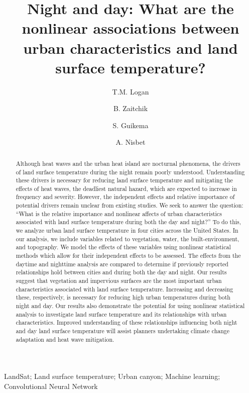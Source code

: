 \documentclass[final,3p,times,twocolumn,sort&compress]{elsarticle}
\begin{document}
\begin{frontmatter}

\title{Night and day: What are the nonlinear associations between urban characteristics and land surface temperature?}

\author[1]{T.M. Logan}

\author[2]{B. Zaitchik}
\author[1]{S. Guikema}
\author[]{A. Nisbet}

\address[1]{Industrial and Operations Engineering, University of Michigan, Ann Arbor, MI}
\address[2]{Earth and Planetary Sciences, Johns Hopkins University, Baltimore, MD}

\begin{abstract}
Although heat waves and the urban heat island are nocturnal phenomena, the drivers of land surface temperature during the night remain poorly understood.
Understanding these drivers is necessary for reducing land surface temperature and mitigating the effects of heat waves, the deadliest natural hazard, which are expected to increase in frequency and severity.
However, the independent effects and relative importance of potential drivers remain unclear from existing studies.
We seek to answer the question: ``What is the relative importance and nonlinear affects of urban characteristics associated with land surface temperature during both the day and night?'' 
To do this, we analyze urban land surface temperature in four cities across the United States.
In our analysis, we include variables related to vegetation, water, the built-environment, and topography. 
We model the effects of these variables using nonlinear statistical methods which allow for their independent effects to be assessed.
The effects from the daytime and nighttime analysis are compared to determine if previously reported relationships hold between cities and during both the day and night.
Our results suggest that vegetation and impervious surfaces are the most important urban characteristics associated with land surface temperature.
Increasing and decreasing these, respectively, is necessary for reducing high urban temperatures during both night and day.
Our results also demonstrate the potential for using nonlinear statistical analysis to investigate land surface temperature and its relationships with urban characteristics. 
Improved understanding of these relationships influencing both night and day land surface temperature will assist planners undertaking climate change adaptation and heat wave mitigation.
\end{abstract}

\begin{keyword}
LandSat; Land surface temperature; Urban canyon; Machine learning; Convolutional Neural Network
\end{keyword}

\end{frontmatter}
\end{document}
